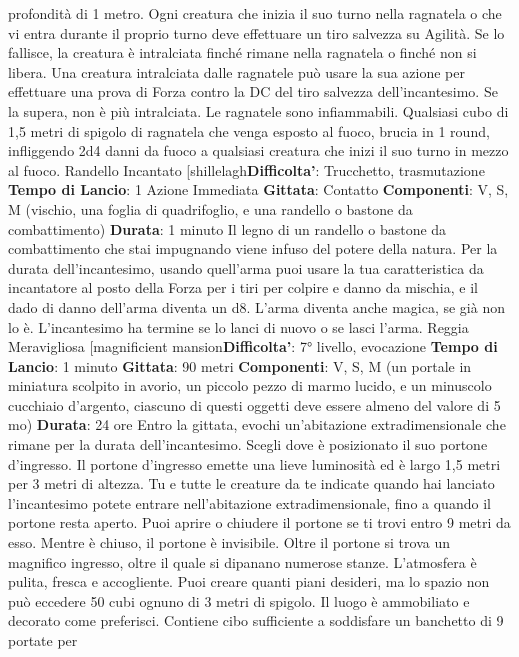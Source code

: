 \begin{multicols}{2}
profondità di 1 metro.
Ogni creatura che inizia il suo turno nella ragnatela o
che vi entra durante il proprio turno deve effettuare un
tiro salvezza su Agilità. Se lo fallisce, la creatura è
intralciata finché rimane nella ragnatela o finché non si
libera.
Una creatura intralciata dalle ragnatele può usare la
sua azione per effettuare una prova di Forza contro la
DC del tiro salvezza dell’incantesimo. Se la supera, non
è più intralciata.
Le ragnatele sono infiammabili. Qualsiasi cubo di 1,5
metri di spigolo di ragnatela che venga esposto al
fuoco, brucia in 1 round, infliggendo 2d4 danni da fuoco
a qualsiasi creatura che inizi il suo turno in mezzo al
fuoco.
Randello Incantato
[shillelagh\textbf{Difficolta'}:
Trucchetto, trasmutazione
\textbf{Tempo di Lancio}: 1 Azione Immediata
\textbf{Gittata}: Contatto
\textbf{Componenti}: V, S, M (vischio, una foglia di
quadrifoglio, e una randello o bastone da
combattimento)
\textbf{Durata}: 1 minuto
Il legno di un randello o bastone da combattimento che
stai impugnando viene infuso del potere della natura.
Per la durata dell’incantesimo, usando quell’arma puoi
usare la tua caratteristica da incantatore al posto della
Forza per i tiri per colpire e danno da mischia, e il dado
di danno dell’arma diventa un d8. L’arma diventa anche
magica, se già non lo è. L’incantesimo ha termine se lo
lanci di nuovo o se lasci l’arma.
Reggia Meravigliosa
[magnificient mansion\textbf{Difficolta'}:
7° livello, evocazione
\textbf{Tempo di Lancio}: 1 minuto
\textbf{Gittata}: 90 metri
\textbf{Componenti}: V, S, M (un portale in miniatura scolpito
in avorio, un piccolo pezzo di marmo lucido, e un
minuscolo cucchiaio d’argento, ciascuno di questi
oggetti deve essere almeno del valore di 5 mo)
\textbf{Durata}: 24 ore
Entro la gittata, evochi un’abitazione extradimensionale
che rimane per la durata dell’incantesimo. Scegli dove è
posizionato il suo portone d’ingresso. Il portone
d’ingresso emette una lieve luminosità ed è largo 1,5
metri per 3 metri di altezza. Tu e tutte le creature da te
indicate quando hai lanciato l’incantesimo potete
entrare nell’abitazione extradimensionale, fino a quando
il portone resta aperto. Puoi aprire o chiudere il portone
se ti trovi entro 9 metri da esso. Mentre è chiuso, il
portone è invisibile.
Oltre il portone si trova un magnifico ingresso, oltre il
quale si dipanano numerose stanze. L’atmosfera è
pulita, fresca e accogliente.
Puoi creare quanti piani desideri, ma lo spazio non può
eccedere 50 cubi ognuno di 3 metri di spigolo. Il luogo è
ammobiliato e decorato come preferisci. Contiene cibo
sufficiente a soddisfare un banchetto di 9 portate per

\end{multicols}
